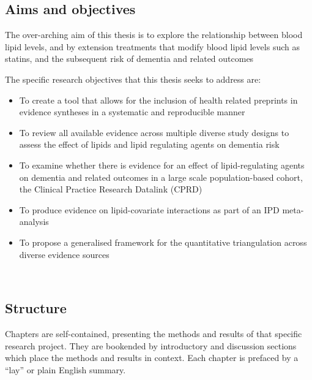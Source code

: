 \documentclass[a4paper, twoside]{templates/ociamthesis}
\providecommand{\tightlist}{%
  \setlength{\itemsep}{0pt}\setlength{\parskip}{0pt}}
\begin{document}
\hypertarget{aims-and-objectives}{%
\subsection{Aims and objectives}\label{aims-and-objectives}}

The over-arching aim of this thesis is to explore the relationship between blood lipid levels, and by extension treatments that modify blood lipid levels such as statins, and the subsequent risk of dementia and related outcomes

The specific research objectives that this thesis seeks to address are:

\begin{itemize}
\tightlist
\item
  To create a tool that allows for the inclusion of health related preprints in evidence syntheses in a systematic and reproducible manner
\item
  To review all available evidence across multiple diverse study designs to assess the effect of lipids and lipid regulating agents on dementia risk
\item
  To examine whether there is evidence for an effect of lipid-regulating agents on dementia and related outcomes in a large scale population-based cohort, the Clinical Practice Research Datalink (CPRD)
\item
  To produce evidence on lipid-covariate interactions as part of an IPD meta-analysis
\item
  To propose a generalised framework for the quantitative triangulation across diverse evidence sources
\end{itemize}

~

\hypertarget{thesis-structure}{%
\subsection{Structure}\label{thesis-structure}}

Chapters are self-contained, presenting the methods and results of that specific research project. They are bookended by introductory and discussion sections which place the methods and results in context. Each chapter is prefaced by a ``lay'' or plain English summary.
\end{document}
